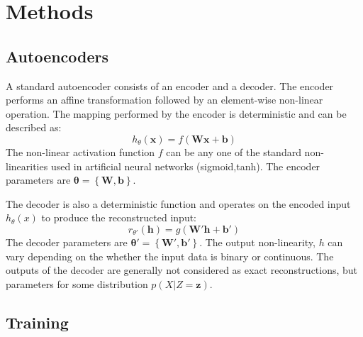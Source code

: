 \documentclass[runningheads,a4paper]{llncs}
\begin{document}
\section{Methods}

\subsection{Autoencoders}

A standard autoencoder consists of an encoder and a decoder. The encoder performs an affine transformation followed by an element-wise non-linear operation. The mapping performed by the encoder is deterministic and can be described as: $$h_{\theta}(\mathbf{x}) = f(\mathbf{Wx + b})$$ The non-linear activation function $f$ can be any one of the standard non-linearities used in artificial neural networks (sigmoid,tanh). The encoder parameters are $\mathbf{\theta = \left\{ W,b \right\}}$. 

The decoder is also a deterministic function and operates on the encoded input $h_{\theta}(x)$ to produce the reconstructed input: $$ r_{\theta'}(\mathbf{h}) = g(\mathbf{W'h + b'})$$ 
The decoder parameters are $\mathbf{\theta' = \left\{ W',b' \right\}}$. The output non-linearity, $h$ can vary depending on the whether the input data is binary or continuous. The outputs of the decoder are generally not considered as exact reconstructions, but parameters for some distribution $p(X|Z=\mathbf{z})$. 

\subsection{Training}
\end{document}
